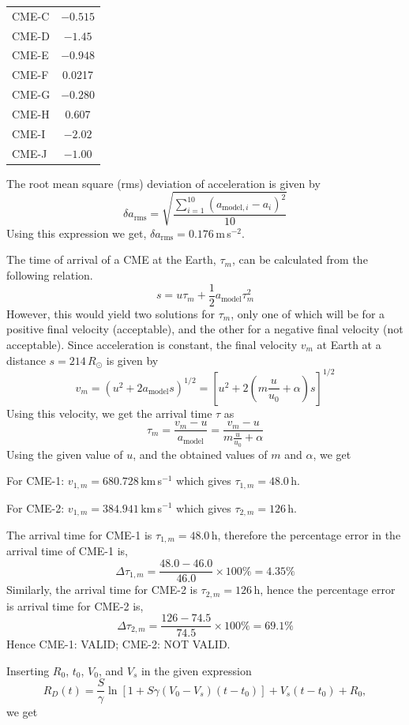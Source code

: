\begin{description}
\begin{center}
\begin{tabular}{l c}
  CME-C & $-0.515$\\
  CME-D & $-1.45$\\
  CME-E & $-0.948$\\
  CME-F & 0.0217\\
  CME-G & $-0.280$\\
  CME-H & 0.607\\
  CME-I & $-2.02$\\
  CME-J & $-1.00$\\
  \bottomrule
  \end{tabular}
  \end{center}
  The root mean square (rms) deviation of acceleration is given by
  \[
  \delta a_{\mathrm{rms}}
    = \sqrt{\frac{\sum_{i=1}^{10}(a_{\mathrm{model},i}-a_i)^2}{10}}
  \]
  Using this expression we get, $\delta a_{\mathrm{rms}} = 0.176$\,m\,s$^{-2}$.
\item[(D02.2a)] The time of arrival of a CME at the Earth, $\tau_m$, can be
  calculated from the following relation.
  \[
  s = u\tau_m + \frac{1}{2}a_{\mathrm{model}}\tau_m^2
  \]
  However, this would yield two solutions for $\tau_m$, only one of which will
  be for a positive final velocity (acceptable), and the other for a negative
  final velocity (not acceptable). Since acceleration is constant, the final
  velocity $v_m$ at Earth at a distance $s = 214\,R_\odot$ is given by
  \[
  v_m = \left(u^2 + 2a_{\mathrm{model}}s\right)^{1/2}
      = \left[u^2 + 2\left(m\frac{u}{u_0}+\alpha\right)s\right]^{1/2}
  \]
  Using this velocity, we get the arrival time $\tau$ as
  \[
  \tau_m = \frac{v_m - u}{a_{\mathrm{model}}}
         = \frac{v_m - u}{m\frac{u}{u_0}+\alpha}
  \]
  Using the given value of $u$, and the obtained values of $m$ and $\alpha$,
  we get

  For CME-1: $v_{1,m} = 680.728$\,km\,s$^{-1}$ which gives
  $\tau_{1,m} = 48.0$\,h.

  For CME-2: $v_{1,m} = 384.941$\,km\,s$^{-1}$ which gives
  $\tau_{2,m} = 126$\,h.
\item[(D02.2b)] The arrival time for CME-1 is $\tau_{1,m} = 48.0$\,h,
  therefore the percentage error in the arrival time of CME-1 is,
  \[
  \Delta\tau_{1,m} = \frac{48.0-46.0}{46.0}\times 100\% = 4.35\%
  \]
  Similarly, the arrival time for CME-2 is $\tau_{2,m} = 126$\,h, hence the
  percentage error is arrival time for CME-2 is,
  \[
  \Delta\tau_{2,m} = \frac{126-74.5}{74.5}\times 100\% = 69.1\%
  \]
  Hence CME-1: VALID; CME-2: NOT VALID.
\item[(D02.3a)] Inserting $R_0$, $t_0$, $V_0$, and $V_s$ in the given
  expression
  \[
  R_D(t) = \frac{S}{\gamma}\ln\left[1 + S\gamma(V_0-V_s)(t-t_0)\right]
         + V_s(t-t_0) + R_0,
  \]
  we get


\end{description}
